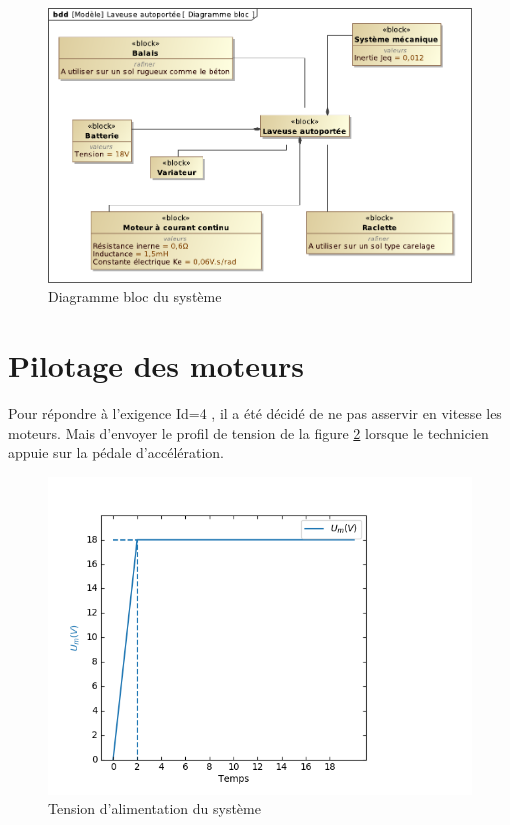 \begin{figure}[!h]
\centering\includegraphics[width=0.8\linewidth]{img/Diagramme_bloc}
 \caption{Diagramme bloc du système}
 \label{img04}
\end{figure}



\section{Pilotage des moteurs}

Pour répondre à l'exigence \og Id=4 \fg, il a été décidé de ne pas asservir en vitesse les moteurs. Mais d'envoyer le profil de tension de la figure \ref{img05} lorsque le technicien appuie sur la pédale d'accélération.

\begin{figure}[!h]
\centering\includegraphics[width=0.6\linewidth]{img/tension}
 \caption{Tension d'alimentation du système}
 \label{img05}
\end{figure}

